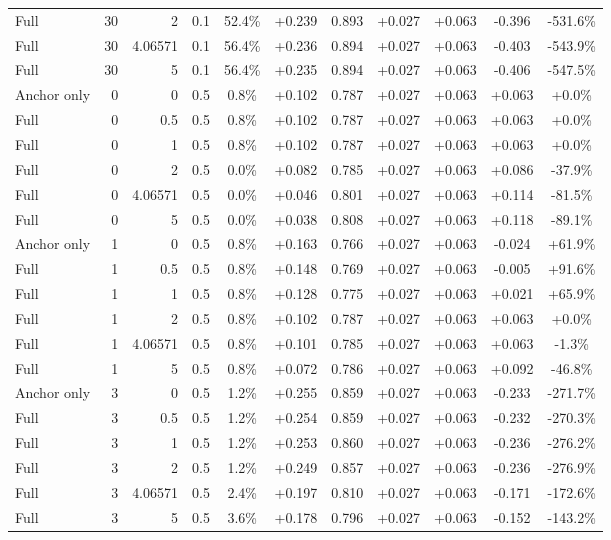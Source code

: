 \begin{table}[htbp]
\begin{tabular}{lrrrccccccc}
Full & 30 & 2 & 0.1 & 52.4\% & +0.239 & 0.893 & +0.027 & +0.063 & -0.396 & -531.6\% \\
Full & 30 & 4.06571 & 0.1 & 56.4\% & +0.236 & 0.894 & +0.027 & +0.063 & -0.403 & -543.9\% \\
Full & 30 & 5 & 0.1 & 56.4\% & +0.235 & 0.894 & +0.027 & +0.063 & -0.406 & -547.5\% \\
Anchor only & 0 & 0 & 0.5 & 0.8\% & +0.102 & 0.787 & +0.027 & +0.063 & +0.063 & +0.0\% \\
Full & 0 & 0.5 & 0.5 & 0.8\% & +0.102 & 0.787 & +0.027 & +0.063 & +0.063 & +0.0\% \\
Full & 0 & 1 & 0.5 & 0.8\% & +0.102 & 0.787 & +0.027 & +0.063 & +0.063 & +0.0\% \\
Full & 0 & 2 & 0.5 & 0.0\% & +0.082 & 0.785 & +0.027 & +0.063 & +0.086 & -37.9\% \\
Full & 0 & 4.06571 & 0.5 & 0.0\% & +0.046 & 0.801 & +0.027 & +0.063 & +0.114 & -81.5\% \\
Full & 0 & 5 & 0.5 & 0.0\% & +0.038 & 0.808 & +0.027 & +0.063 & +0.118 & -89.1\% \\
Anchor only & 1 & 0 & 0.5 & 0.8\% & +0.163 & 0.766 & +0.027 & +0.063 & -0.024 & +61.9\% \\
Full & 1 & 0.5 & 0.5 & 0.8\% & +0.148 & 0.769 & +0.027 & +0.063 & -0.005 & +91.6\% \\
Full & 1 & 1 & 0.5 & 0.8\% & +0.128 & 0.775 & +0.027 & +0.063 & +0.021 & +65.9\% \\
Full & 1 & 2 & 0.5 & 0.8\% & +0.102 & 0.787 & +0.027 & +0.063 & +0.063 & +0.0\% \\
Full & 1 & 4.06571 & 0.5 & 0.8\% & +0.101 & 0.785 & +0.027 & +0.063 & +0.063 & -1.3\% \\
Full & 1 & 5 & 0.5 & 0.8\% & +0.072 & 0.786 & +0.027 & +0.063 & +0.092 & -46.8\% \\
Anchor only & 3 & 0 & 0.5 & 1.2\% & +0.255 & 0.859 & +0.027 & +0.063 & -0.233 & -271.7\% \\
Full & 3 & 0.5 & 0.5 & 1.2\% & +0.254 & 0.859 & +0.027 & +0.063 & -0.232 & -270.3\% \\
Full & 3 & 1 & 0.5 & 1.2\% & +0.253 & 0.860 & +0.027 & +0.063 & -0.236 & -276.2\% \\
Full & 3 & 2 & 0.5 & 1.2\% & +0.249 & 0.857 & +0.027 & +0.063 & -0.236 & -276.9\% \\
Full & 3 & 4.06571 & 0.5 & 2.4\% & +0.197 & 0.810 & +0.027 & +0.063 & -0.171 & -172.6\% \\
Full & 3 & 5 & 0.5 & 3.6\% & +0.178 & 0.796 & +0.027 & +0.063 & -0.152 & -143.2\% \\

\end{tabular}
\end{table}
